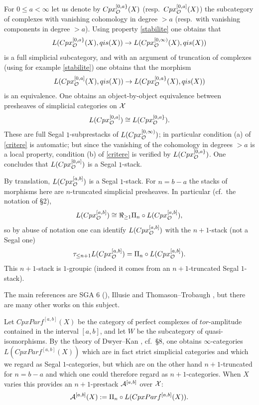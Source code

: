 For $0\leq a < \infty$ let us denote by
$Cpx_{{\cal O}}^{[0, a\} }(X)$ (resp.\ $Cpx_{{\cal O}}^{[0, a]}(X)$)
the subcategory of complexes with vanishing cohomology
in degree $>a$ (resp.\ with
vanishing components in degree $>a$). Using property
\ref{stabilite} one obtains that
$$
L(Cpx_{{\cal O}}^{[0, a\} }(X), qis(X))\rightarrow
L(Cpx_{{\cal O}}^{[0, \infty )}(X), qis(X))
$$
is a full simplicial subcategory, and with an argument of truncation
of complexes (using for example \ref{stabilite}) one obtains that the
morphism
$$
L(Cpx_{{\cal O}}^{[0, a] }(X), qis(X))\rightarrow
L(Cpx_{{\cal O}}^{[0, a\} }(X), qis(X))
$$
is an equivalence. One obtains an object-by-object equivalence
between presheaves of simplicial categories on ${\cal X}$
$$
L(Cpx_{{\cal O}}^{[0, a] })\cong
L(Cpx_{{\cal O}}^{[0, a\} }).
$$
These are full Segal $1$-subprestacks of
$L(Cpx_{{\cal O}}^{[0, \infty )})$; in particular
condition (a) of \ref{critere} is
automatic; but since the vanishing of the cohomology in
degrees $>a$ is
a local property, condition (b) of \ref{critere} is verified by
$L(Cpx_{{\cal O}}^{[0, a\} })$. One concludes that
$L(Cpx_{{\cal O}}^{[0, a] })$ is a Segal $1$-stack.

By translation, $L(Cpx _{{\cal O}}^{[a,b]})$ is a Segal $1$-stack. For
$n=b-a$ the stacks of morphisms here are $n$-truncated simplicial
presheaves. In particular (cf.\ the notation of \S2),
$$
L(Cpx _{{\cal O}}^{[a,b]})\cong \Re _{\geq 1}
\Pi _n \circ L(Cpx _{{\cal O}}^{[a,b]}),
$$
so by abuse of notation one can identify $L(Cpx _{{\cal O}}^{[a,b]})$
with the $n+1$-stack (not a Segal one)
$$
\tau _{\leq n+1}L(Cpx _{{\cal O}}^{[a,b]})=\Pi _n \circ L(Cpx _{{\cal O}}^{[a,b]}).
$$
This $n+1$-stack is $1$-groupic (indeed it comes from an
$n+1$-truncated Segal $1$-stack).



The main references are SGA 6 (\cite{SGA6}), Illusie \cite{Illusie} and
Thomason--Trobaugh \cite{ThomasonTrobaugh}, but there are many other
works on this subject.

Let $CpxParf^{[a,b]}(X)$ be the category of perfect complexes of
$tor$-amplitude contained in the interval $[a,b]$, and let $W$ be the
subcategory of quasi-isomorphisms. By the theory of Dwyer--Kan
\cite{DwyerKan3}, cf.\ \S8, one obtains $\infty$-categories
$L( CpxParf^{[a,b]}(X))$
which are in fact
strict simplicial categories and which we regard as
Segal $1$-categories, but which are on the other hand $n+1$-truncated for
$n=b-a$ and which one could therefore regard as $n+1$-categories. When
$X$ varies this provides an $n+1$-prestack ${\cal A}^{[a,b]}$
over ${\cal X}$:
$$
{\cal A}^{[a,b]} (X):= \Pi _n \circ L( CpxParf^{[a,b]}(X)).
$$

